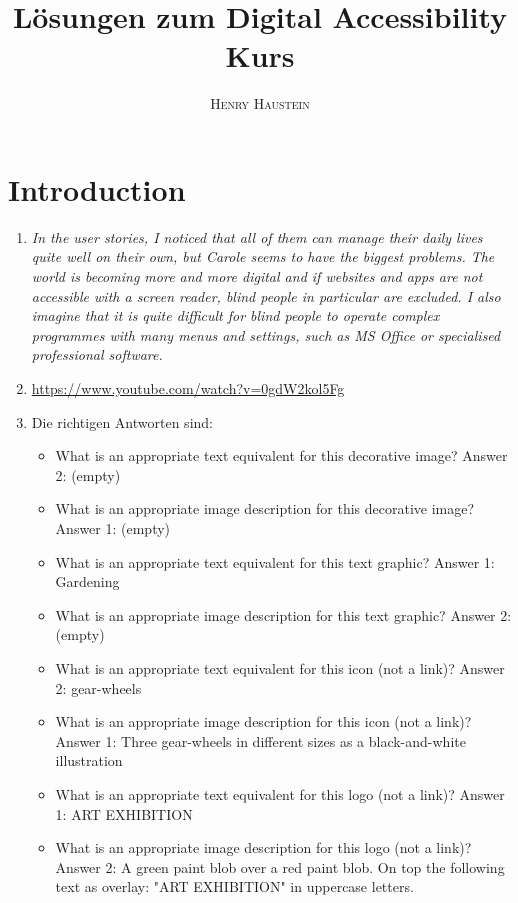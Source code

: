 \documentclass{article}
\title{\textbf{Lösungen zum Digital Accessibility Kurs}}
\author{\textsc{Henry Haustein}}
\date{}
\begin{document}
	\maketitle
	
	\section*{Introduction}
	\begin{enumerate}[label=(\alph*)]
		\item \textit{In the user stories, I noticed that all of them can manage their daily lives quite well on their own, but Carole seems to have the biggest problems. The world is becoming more and more digital and if websites and apps are not accessible with a screen reader, blind people in particular are excluded. I also imagine that it is quite difficult for blind people to operate complex programmes with many menus and settings, such as MS Office or specialised professional software.}
		\item \url{https://www.youtube.com/watch?v=0gdW2kol5Fg}
		\item Die richtigen Antworten sind:
		\begin{itemize}
			\item What is an appropriate text equivalent for this decorative image? \textcolor{green!90!black}{Answer 2: (empty)}
			\item What is an appropriate image description for this decorative image? \textcolor{green!90!black}{Answer 1: (empty)}
			\item What is an appropriate text equivalent for this text graphic? \textcolor{green!90!black}{Answer 1: Gardening}
			\item What is an appropriate image description for this text graphic? \textcolor{green!90!black}{Answer 2: (empty)}
			\item What is an appropriate text equivalent for this icon (not a link)? \textcolor{green!90!black}{Answer 2: gear-wheels}
			\item What is an appropriate image description for this icon (not a link)? \textcolor{green!90!black}{Answer 1: Three gear-wheels in different sizes as a black-and-white illustration}
			\item What is an appropriate text equivalent for this logo (not a link)? \textcolor{green!90!black}{Answer 1: ART EXHIBITION}
			\item What is an appropriate image description for this logo (not a link)? \textcolor{green!90!black}{Answer 2: A green paint blob over a red paint blob. On top the following text as overlay: "ART EXHIBITION" in uppercase letters.}

\end{itemize}
\end{enumerate}
\end{document}
